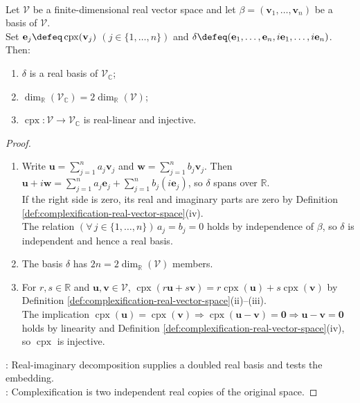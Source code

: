 \begin{proposition} \label{prop:complexification-real-dimension-and-embedding} \\
Let $\mathcal{V}$ be a finite-dimensional real vector space and let $\beta=(\mathbf{v}_1,\ldots,\mathbf{v}_n)$ be a basis of $\mathcal{V}$.\\
Set $\mathbf{e}_j\defeq\operatorname{cpx}(\mathbf{v}_j)$ $(j\in\{1,\ldots,n\})$ and $\delta\defeq(\mathbf{e}_1,\ldots,\mathbf{e}_n,i\mathbf{e}_1,\ldots,i\mathbf{e}_n)$. Then:
\begin{enumerate}[label=(\roman*)]
\setlength{\itemsep}{0pt}
\item $\delta$ is a real basis of $\mathcal{V}_{\mathbb{C}}$;
\item $\dim_{\mathbb{R}}(\mathcal{V}_{\mathbb{C}})=2\dim_{\mathbb{R}}(\mathcal{V})$;
\item $\operatorname{cpx}:\mathcal{V}\to\mathcal{V}_{\mathbb{C}}$ is real-linear and injective.
\end{enumerate}
\begin{proof}
\begin{enumerate}[label=(\roman*)]
\setlength{\itemsep}{0pt}
\item Write $\mathbf{u}=\sum\limits_{j=1}^{n}a_j\mathbf{v}_j$ and $\mathbf{w}=\sum\limits_{j=1}^{n}b_j\mathbf{v}_j$. Then $\mathbf{u}+i\mathbf{w}=\sum\limits_{j=1}^{n}a_j\mathbf{e}_j+\sum\limits_{j=1}^{n}b_j(i\mathbf{e}_j)$, so $\delta$ spans over $\mathbb{R}$.\\
If the right side is zero, its real and imaginary parts are zero by Definition \ref{def:complexification-real-vector-space}(iv).\\
The relation $(\forall\,j\in\{1,\ldots,n\})\,a_j=b_j=0$ holds by independence of $\beta$, so $\delta$ is independent and hence a real basis.
\item The basis $\delta$ has $2n=2\dim_{\mathbb{R}}(\mathcal{V})$ members.
\item For $r,s\in\mathbb{R}$ and $\mathbf{u},\mathbf{v}\in\mathcal{V}$, $\operatorname{cpx}(r\mathbf{u}+s\mathbf{v})=r\operatorname{cpx}(\mathbf{u})+s\operatorname{cpx}(\mathbf{v})$ by Definition \ref{def:complexification-real-vector-space}(ii)--(iii).\\
The implication $\operatorname{cpx}(\mathbf{u})=\operatorname{cpx}(\mathbf{v})\Rightarrow\operatorname{cpx}(\mathbf{u}-\mathbf{v})=\mathbf{0}\Rightarrow\mathbf{u}-\mathbf{v}=\mathbf{0}$ holds by linearity and Definition \ref{def:complexification-real-vector-space}(iv), so $\operatorname{cpx}$ is injective.
\end{enumerate}
: Real-imaginary decomposition supplies a doubled real basis and tests the embedding.\\
: Complexification is two independent real copies of the original space.
\end{proof}
\end{proposition}

